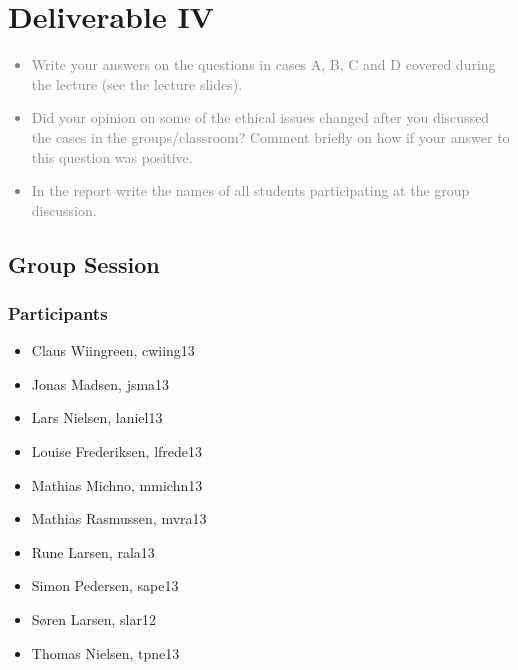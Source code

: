 \chapter{Deliverable IV}
\textcolor{gray}{%
\begin{itemize}
    \item Write your answers on the questions in cases A, B, C and D covered during the lecture (see the lecture slides).
    \item Did your opinion on some of the ethical issues changed after you discussed the cases in the groups/classroom? Comment briefly on how if your answer to this question was positive.
    \item In the report write the names of all students participating at the group discussion.
\end{itemize}}

\section{Group Session}
\subsection{Participants}
\begin{multicols}{2}
    \begin{itemize}
        \item Claus Wiingreen, cwiing13 
        \item Jonas Madsen, jsma13
        \item Lars Nielsen, laniel13
        \item Louise Frederiksen, lfrede13 
        \item Mathias Michno, mmichn13
        \item Mathias Rasmussen, mvra13
        \item Rune Larsen, rala13
        \item Simon Pedersen, sape13
        \item Søren Larsen, slar12
        \item Thomas Nielsen, tpne13
    \end{itemize}
\end{multicols}
